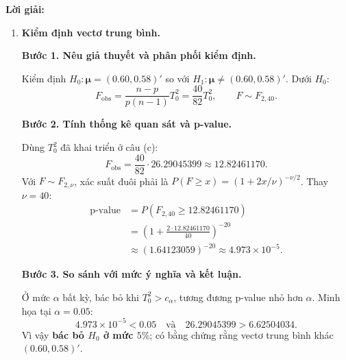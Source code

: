 \documentclass[11pt,a4paper]{article}
\renewcommand{\boldsymbol}[1]{\symbf{#1}}
\newenvironment{solution}{%
  \par\medskip\noindent\textbf{Lời giải:}\par\nobreak\smallskip\noindent\ignorespaces
}{\par}
\newcommand{\step}[2]{\par\medskip\noindent\textbf{Bước #1. #2}\par\nopagebreak[4]\smallskip\noindent}
\begin{document}
\begin{solution}
\begin{enumerate}[label=\textbf{\alph*)}]
Ở đây $I_1=I_{T,1}$, $I_2=I_{T,2}$.
\step{3}{Kiểm tra điểm trong hình chữ nhật.}
Kiểm tra riêng hai tọa độ của $\boldsymbol{\mu}_0$:
\begin{align*}
0.51634&\le0.60\le0.61166,\\
0.55501&\le0.58\le0.65099.
\end{align*}
Cả hai đều đúng nên $\boldsymbol{\mu}_0\in R_2$ ở mức $95\%$.
\step{4}{So sánh hai miền.}
Mỗi điểm trong ellipse có từng tọa độ nằm trong khoảng chiếu tương ứng,
nên $CR_1\subset R_2$. Câu (c) cho thấy $\boldsymbol{\mu}_0\notin CR_1$
dù $\boldsymbol{\mu}_0\in R_2$; kiểm tra từng tọa độ riêng chưa đủ để
kết luận điểm thuộc ellipse.
\item \textbf{Kiểm định vectơ trung bình.}\par\nopagebreak[4]
\step{1}{Nêu giả thuyết và phân phối kiểm định.}
Kiểm định $H_0:\boldsymbol{\mu}=(0.60,0.58)'$ so với
$H_1:\boldsymbol{\mu}\ne(0.60,0.58)'$.
Dưới $H_0$:
\[
F_{\mathrm{obs}}=\frac{n-p}{p(n-1)}T_0^2
=\frac{40}{82}T_0^2,\qquad F\sim F_{2,40}.
\]
\step{2}{Tính thống kê quan sát và p-value.}
Dùng $T_0^2$ đã khai triển ở câu (c):
\[
F_{\mathrm{obs}}=\frac{40}{82}\cdot26.29045399\approx12.82461170.
\]
Với $F\sim F_{2,\nu}$, xác suất đuôi phải là
$P(F\ge x)=(1+2x/\nu)^{-\nu/2}$. Thay $\nu=40$:
\begin{align*}
\text{p-value}&=P(F_{2,40}\ge12.82461170)\\
&=\left(1+\frac{2\cdot12.82461170}{40}\right)^{-20}\\
&\approx(1.64123059)^{-20}\approx4.973\times10^{-5}.
\end{align*}
\step{3}{So sánh với mức ý nghĩa và kết luận.}
Ở mức $\alpha$ bất kỳ, bác bỏ khi $T_0^2>c_\alpha$, tương đương
p-value nhỏ hơn $\alpha$. Minh họa tại $\alpha=0.05$:
\[
4.973\times10^{-5}<0.05\quad\text{và}\quad26.29045399>6.62504034.
\]
Vì vậy \textbf{bác bỏ $H_0$ ở mức $5\%$}; có bằng chứng rằng vectơ trung bình
khác $(0.60,0.58)'$.
\end{enumerate}
\end{solution}
\end{document}
